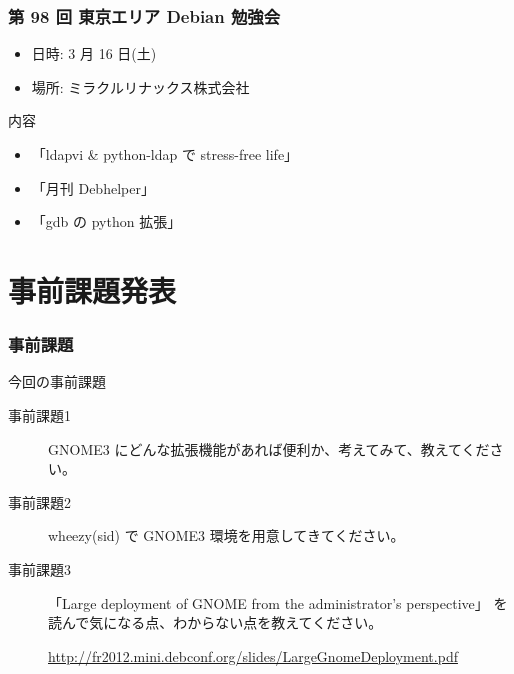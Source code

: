 \documentclass[cjk,dvipdfmx,10pt,compress,%
hyperref={bookmarks=true,bookmarksnumbered=true,bookmarksopen=false,%
colorlinks=false,%
pdftitle={第 70 回 関西 Debian 勉強会},%
pdfauthor={倉敷・のがた・佐々木・かわだ・八津尾},%
pdfsubject={資料},%
}]{beamer}
\begin{document}
\begin{frame}[fragile]
  \frametitle{第 98 回 東京エリア Debian 勉強会}
  \begin{itemize}
  \item 日時: 3 月 16 日(土)
  \item 場所: ミラクルリナックス株式会社
  \end{itemize}
  \begin{block}{内容}
    \begin{itemize}
    \item 「ldapvi \& python-ldap で stress-free life」
    \item 「月刊 Debhelper」
    \item 「gdb の python 拡張」
    \end{itemize}
  \end{block}
\end{frame}


\section{事前課題発表}


\begin{frame}[fragile]
  \frametitle{事前課題}
  \begin{block}{今回の事前課題}
    \begin{description}
    \item[事前課題1] GNOME3 にどんな拡張機能があれば便利か、考えてみて、教えてください。

    \item[事前課題2] wheezy(sid) で GNOME3 環境を用意してきてください。
    
    \item[事前課題3] 「Large deployment of GNOME from the administrator's perspective」
    を読んで気になる点、わからない点を教えてください。

    \url{http://fr2012.mini.debconf.org/slides/LargeGnomeDeployment.pdf}

    \end{description}
  \end{block}
\end{frame}

\end{document}
